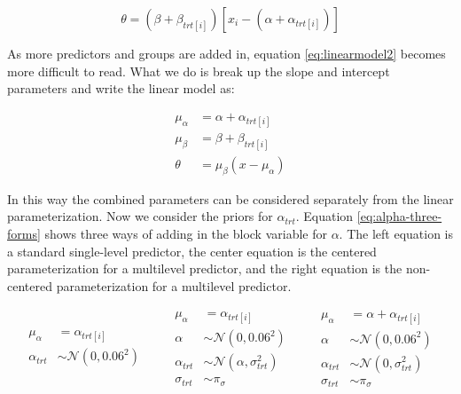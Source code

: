 \documentclass[11pt, oneside, openany]{scrbook}
\begin{document}

\begin{equation}
  \theta = (\beta + \beta_{trt[i]}) \left[x_i - (\alpha + \alpha_{trt[i]})\right]
  \label{eq:linearmodel2}
\end{equation}

As more predictors and groups are added in, equation \eqref{eq:linearmodel2} becomes more difficult to read. What we do is break up the slope and intercept parameters and write the linear model as:


\begin{align*}
\mu_\alpha &= \alpha + \alpha_{trt[i]} \\
\mu_\beta &= \beta + \beta_{trt[i]} \\
\theta &= \mu_\beta (x - \mu_\alpha)
\end{align*}

In this way the combined parameters can be considered separately from the linear parameterization. Now we consider the priors for \(\alpha_{trt}\). Equation \eqref{eq:alpha-three-forms} shows three ways of adding in the block variable for \(\alpha\). The left equation is a standard single-level predictor, the center equation is the centered parameterization for a multilevel predictor, and the right equation is the non-centered parameterization for a multilevel predictor.


\begin{equation}
  \begin{split}
    \mu_\alpha &= \alpha_{trt[i]} \\
    \alpha_{trt} &\sim \mathcal{N}(0, 0.06^2)
  \end{split}
\qquad
  \begin{split}
    \mu_\alpha &= \alpha_{trt[i]} \\
    \alpha &\sim \mathcal{N}(0, 0.06^2) \\
    \alpha_{trt} &\sim \mathcal{N}(\alpha, \sigma_{trt}^2) \\
    \sigma_{trt} &\sim \pi_{\sigma}
  \end{split}
\qquad
  \begin{split}
    \mu_\alpha &= \alpha + \alpha_{trt[i]} \\
    \alpha &\sim \mathcal{N}(0, 0.06^2) \\
    \alpha_{trt} &\sim \mathcal{N}(0, \sigma_{trt}^2) \\
    \sigma_{trt} &\sim \pi_{\sigma}
  \end{split}
\label{eq:alpha-three-forms}
\end{equation}
\end{document}

